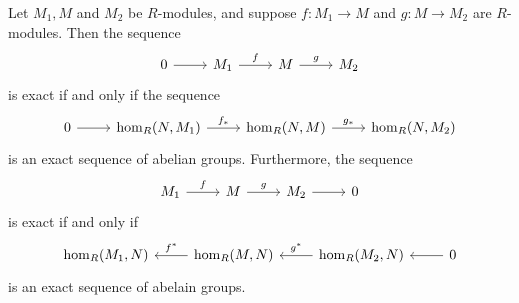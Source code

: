 \begin{thm}
    Let $M_1, M$ and $M_2$ be $R$-modules, and suppose $f:M_1 \to
    M$ and $g:M \to M_2$ are $R$-modules. Then the sequence
    \begin{equation}\label{0_M_1MM_2_short_exact}
        \begin{tikzcd}
            0 \arrow[r]
            &
            M_{1} \arrow[r, "f"]
            &
            M \arrow[r, "g"]
            &
            M_{2}
        \end{tikzcd}
    \end{equation}
    is exact if and only if the sequence 
        \begin{equation} \label{0_homM1_homM_homM2_exact_sequence}
        \begin{tikzcd}
            0 \arrow[r]
            &
            \hom_R(N,M_{1}) \arrow[r, "f_*"]
            &
            \hom_R(N, M) \arrow[r, "g_*"]
            &
            \hom_R(N,M_{2})
        \end{tikzcd}
    \end{equation}
    is an exact sequence of abelian groups. Furthermore, the sequence 
    \begin{equation}\label{M_1MM_2_0_short_exact}
        \begin{tikzcd}
            M_{1} \arrow[r, "f"]
            &
            M \arrow[r, "g"]
            &
            M_{2} \arrow[r]
            &
            0
        \end{tikzcd}
    \end{equation}
    is exact if and only if 
    \begin{equation}\label{homM1_homM_homM2_0_exact_sequence}
        \begin{tikzcd}
            \hom_R(M_{1}, N)
            &
            \hom_R(M, N) \arrow[l, swap, "f^*"]
            &
            \hom_R(M_{2}, N)\arrow[l, swap, "g^*"]
            & 
            0 \arrow[l]
        \end{tikzcd}
    \end{equation}
    is an exact sequence of abelain groups.
\end{thm}

